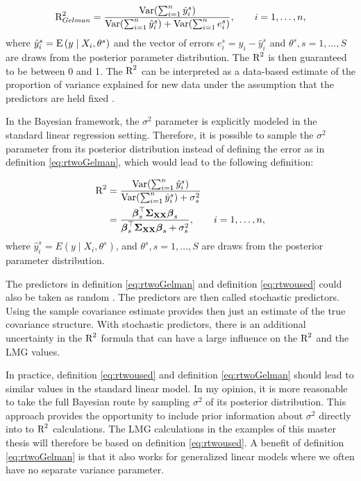 \documentclass[11pt,a4paper,twoside]{book}
\begin{document}
      \begin{align} 
       \text{R}^2_{Gelman} = \frac{\operatorname{Var}(\sum_{i=1}^{n}\hat{y}^s_{i})}{\operatorname{Var}(\sum_{i=1}^{n}\hat{y}^s_{i})+\operatorname{Var}(\sum_{i=1}^{n}e^s_{i})}, \qquad i = 1,\dots,n, \label{eq:rtwoGelman} 
   \end{align} 
where $\hat{y}^s_{i}  = \operatorname{E} \left({y \mid X_{i}, \theta^s}\right) $ and the vector of errors $e^s_{i} = y_{i} - \hat{y}^s_{i}$ and $\theta^s, s = 1,\dotsc, S$ are draws from the posterior parameter distribution. The $\text{R}^2$ is then guaranteed to be between 0 and 1. The $\text{R}^2$ can  be interpreted as a data-based estimate of the proportion of variance explained for new data under the assumption that the predictors are held fixed \citep{Gelman2017}.

In the Bayesian framework, the $\sigma^2$ parameter is explicitly modeled in the standard linear regression setting. Therefore, it is possible to sample the $\sigma^2$ parameter from its posterior distribution instead of defining the error as in definition \eqref{eq:rtwoGelman}, which would lead to the following definition:

    \begin{align} 
        \text{R}^2 &= \frac{\operatorname{Var}(\sum_{i=1}^{n}\hat{y}^s_{i})}{\operatorname{Var}(\sum_{i=1}^{n}\hat{y}^s_{i})+\sigma_{s}^2} \nonumber \\ &= \frac{{\boldsymbol{\beta}}_{s}^\top {\boldsymbol{\Sigma}}{}_{{\mathbf{X}} {\mathbf{X}}}  {\boldsymbol{\beta}}_{s}}{{\boldsymbol{\beta}}_{s}^\top {\boldsymbol{\Sigma}}{}_{{\mathbf{X}} {\mathbf{X}}}  {\boldsymbol{\beta}}_{s}+\sigma_{s}^2}, \qquad i = 1,\dots,n, \label{eq:rtwoused} 
   \end{align} 
 where $\hat{y}^s_{i}  = E \left({y \mid X_{i}, \theta^s}\right) $,  and $\theta^s, s = 1,\dotsc, S$ are draws from the posterior parameter distribution.


The predictors in definition \eqref{eq:rtwoGelman} and definition \eqref{eq:rtwoused} could also be taken as random \citep{Gelman2017}. The predictors are then called stochastic predictors. Using the sample covariance estimate provides then just an estimate of the true covariance structure. With stochastic predictors, there is an additional uncertainty in the $\text{R}^2$ formula that can have a large influence on the $\text{R}^2$ and the LMG values.

In practice, definition \eqref{eq:rtwoused} and definition \eqref{eq:rtwoGelman} should lead to  similar values in the standard linear model. In my opinion, it is more reasonable to take the full Bayesian route by sampling  $\sigma^2$ of its posterior distribution. This approach provides the opportunity to include prior information about $\sigma^2$ directly into to $\text{R}^2$ calculations. The LMG calculations in the examples of this master thesis will therefore be based on definition \eqref{eq:rtwoused}.  A benefit of definition \eqref{eq:rtwoGelman} is that it also works for generalized linear models where we often have no separate variance parameter.
\end{document}
